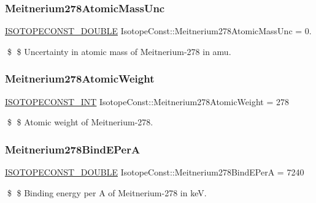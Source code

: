 \subsubsection{\texorpdfstring{Meitnerium278\+Atomic\+Mass\+Unc}{Meitnerium278AtomicMassUnc}}
{\footnotesize\ttfamily \mbox{\hyperlink{group___isotope_const-_macros_ga8f45a7272ce02c0b4c65c44636ed719a}{I\+S\+O\+T\+O\+P\+E\+C\+O\+N\+S\+T\+\_\+\+D\+O\+U\+B\+LE}} Isotope\+Const\+::\+Meitnerium278\+Atomic\+Mass\+Unc = 0.}

\$ \$ Uncertainty in atomic mass of Meitnerium-\/278 in amu. \mbox{\label{group___isotope_const-_meitnerium-_mt278_gae37ec4145ef14b6697bcd876a8faa621}} 
\subsubsection{\texorpdfstring{Meitnerium278\+Atomic\+Weight}{Meitnerium278AtomicWeight}}
{\footnotesize\ttfamily \mbox{\hyperlink{group___isotope_const-_macros_ga5f18360b3e99483a35c32d789e62621c}{I\+S\+O\+T\+O\+P\+E\+C\+O\+N\+S\+T\+\_\+\+I\+NT}} Isotope\+Const\+::\+Meitnerium278\+Atomic\+Weight = 278}

\$ \$ Atomic weight of Meitnerium-\/278. \mbox{\label{group___isotope_const-_meitnerium-_mt278_ga9518bb448912e007a9fb2767e21d4a94}} 
\subsubsection{\texorpdfstring{Meitnerium278\+Bind\+E\+PerA}{Meitnerium278BindEPerA}}
{\footnotesize\ttfamily \mbox{\hyperlink{group___isotope_const-_macros_ga8f45a7272ce02c0b4c65c44636ed719a}{I\+S\+O\+T\+O\+P\+E\+C\+O\+N\+S\+T\+\_\+\+D\+O\+U\+B\+LE}} Isotope\+Const\+::\+Meitnerium278\+Bind\+E\+PerA = 7240}

\$ \$ Binding energy per A of Meitnerium-\/278 in keV. \mbox{\label{group___isotope_const-_meitnerium-_mt278_gaf61ec2824f2ad4ae12f2d5b69d6b78dd}} 
